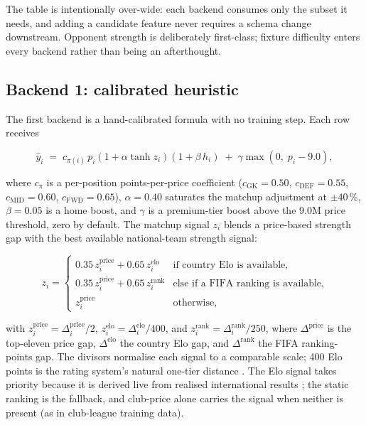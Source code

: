The table is intentionally over-wide: each backend consumes only the
subset it needs, and adding a candidate feature never requires a
schema change downstream. Opponent strength is deliberately
first-class; fixture difficulty enters every backend rather than
being an afterthought.

\subsection{Backend 1: calibrated heuristic}
\label{sec:methodology-heuristic}

The first backend is a hand-calibrated formula with no training step.
Each row receives

\begin{equation}
\hat{y}_i \;=\; c_{\pi(i)}\, p_i
  \left(1 + \alpha \tanh z_i\right)
  \left(1 + \beta\, h_i\right)
  \;+\; \gamma \max\!\left(0,\; p_i - 9.0\right),
\label{eq:heuristic}
\end{equation}

where $c_{\pi}$ is a per-position points-per-price coefficient
($c_{\mathrm{GK}} = 0.50$, $c_{\mathrm{DEF}} = 0.55$,
$c_{\mathrm{MID}} = 0.60$, $c_{\mathrm{FWD}} = 0.65$), $\alpha = 0.40$
saturates the matchup adjustment at $\pm 40$\,\%, $\beta = 0.05$ is a
home boost, and $\gamma$ is a premium-tier boost above the 9.0M price
threshold, zero by default. The matchup signal $z_i$ blends a
price-based strength gap with the best available national-team
strength signal:

\begin{equation}
z_i =
\begin{cases}
0.35\, z^{\mathrm{price}}_i + 0.65\, z^{\mathrm{elo}}_i
  & \text{if country Elo is available,}\\[2pt]
0.35\, z^{\mathrm{price}}_i + 0.65\, z^{\mathrm{rank}}_i
  & \text{else if a FIFA ranking is available,}\\[2pt]
z^{\mathrm{price}}_i & \text{otherwise,}
\end{cases}
\label{eq:heuristic-z}
\end{equation}

with $z^{\mathrm{price}}_i = \Delta^{\mathrm{price}}_i / 2$,
$z^{\mathrm{elo}}_i = \Delta^{\mathrm{elo}}_i / 400$, and
$z^{\mathrm{rank}}_i = \Delta^{\mathrm{rank}}_i / 250$, where
$\Delta^{\mathrm{price}}$ is the top-eleven price gap,
$\Delta^{\mathrm{elo}}$ the country Elo gap, and
$\Delta^{\mathrm{rank}}$ the FIFA ranking-points gap. The divisors
normalise each signal to a comparable scale; 400 Elo points is the
rating system's natural one-tier distance \citep{elo1978rating}. The
Elo signal takes priority because it is derived live from realised
international results \citep{hvattum2010using}; the static ranking is
the fallback, and club-price alone carries the signal when neither is
present (as in club-league training data).

